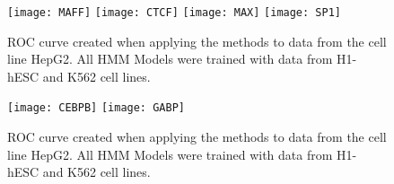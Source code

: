 \documentclass[11pt,a4]{article}
\begin{document}
\begin{figure}[h]
\centering
    \texttt{[image: MAFF]}
    \texttt{[image: CTCF]}
    \texttt{[image: MAX]}
    \texttt{[image: SP1]}
\caption{ROC curve created when applying the methods to data from the cell line HepG2. All HMM Models were trained with data from H1-hESC and K562 cell lines.}
\label{fig:roc.HepG2.fdr_4.6}
\end{figure}

\begin{figure}[h]
\centering
    \texttt{[image: CEBPB]}
    \texttt{[image: GABP]}
\caption{ROC curve created when applying the methods to data from the cell line HepG2. All HMM Models were trained with data from H1-hESC and K562 cell lines.}
\label{fig:roc.HepG2.fdr_4.7}
\end{figure}
\end{document}
